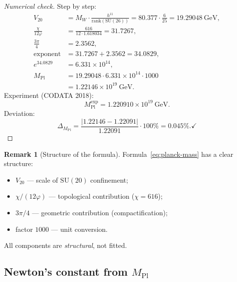 \documentclass[11pt,a4paper]{article}
\newcommand{\SU}{\mathrm{SU}}
\newcommand{\Mpl}{M_{\text{Pl}}}
\theoremstyle{definition}
\newtheorem{remark}[theorem]{Remark}
\begin{document}
\begin{proof}[Numerical check]
Step by step:
\begin{align}
    V_{20} &= M_W \cdot \frac{h^{11}}{\mathrm{rank}(\SU(26))} 
           = 80.377 \cdot \frac{6}{25} = 19.29048~\text{GeV}, \\
    \frac{\chi}{12\varphi} &= \frac{616}{12 \cdot 1.618034} 
                            = 31.7267, \\
    \frac{3\pi}{4} &= 2.3562, \\
    \text{exponent} &= 31.7267 + 2.3562 = 34.0829, \\
    e^{34.0829} &= 6.331 \times 10^{14}, \\
    \Mpl &= 19.29048 \cdot 6.331 \times 10^{14} \cdot 1000 \\
         &= 1.22146 \times 10^{19}~\text{GeV}.
\end{align}
Experiment (CODATA 2018):
\begin{equation}
    \Mpl^{\text{exp}} = 1.220910 \times 10^{19}~\text{GeV}.
\end{equation}
Deviation:
\begin{equation}
    \Delta_{\Mpl} = \frac{|1.22146 - 1.22091|}{1.22091} \cdot 100\% 
    = \mathbf{0.045\%}. \checkmark
\end{equation}
\end{proof}

\begin{remark}[Structure of the formula]
\label{rem:planck-structure}
Formula~\eqref{eq:planck-mass} has a clear structure:
\begin{itemize}
    \item $V_{20}$ — scale of $\SU(20)$ confinement;
    \item $\chi/(12\varphi)$ — topological contribution ($\chi = 616$);
    \item $3\pi/4$ — geometric contribution (compactification);
    \item factor $1000$ — unit conversion.
\end{itemize}
All components are \emph{structural}, not fitted.
\end{remark}

\subsection{Newton's constant from $\Mpl$}
\label{subsec:newton-constant}
\end{document}
